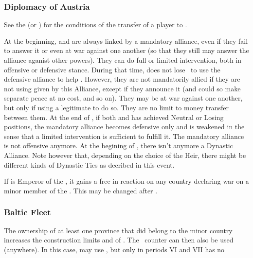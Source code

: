 \subsubsection{Diplomacy of Austria}

\aparag See the  (or
) for the conditions of the
transfer of a player to \AUS.

\label{chSpecific:Habsburg Dynastic Alliance:Major}
\bparag At the beginning,  \SPA and \AUS are always linked by a
mandatory alliance, even if they fail to answer it or even at war against
one another (so that they still may answer the alliance aganist other powers).
They can do full or limited intervention, both in offensive or defensive stance.
\bparag During that time, \SPA does not lose \STAB\ to use the defensive
alliance to help \AUS.
\bparag However, they are not mandatorily allied if they are not using
\CB given by this Alliance, except if they announce it (and could so
make separate peace at no cost, and so on).
\bparag They may be at war against one another, but only if using a
legitimate \CB to do so.
\bparag They are no limit to money transfer between them.
\bparag At the end of , if both \SPA and \AUS has
achieved Neutral or Losing positions, the mandatory alliance becomes
defensive only and is weakened in the sense that a limited intervention
is sufficient to fulfill it. The mandatory alliance is not offensive
anymore.
\bparag At the begining of  , there isn't anymore a Dynastic
Alliance. Note however that, depending on the choice of the Heir, there might
be different kinds of Dynastic Ties as decribed in this event.

\aparag[\HRE] If \AUS is Emperor of the \HRE,
it gains a free \CB in reaction on any country declaring war on a minor
member of the \HRE.
This may be changed after .

\subsubsection{Baltic Fleet}\label{chSpecific:Austria:Baltic Fleet}
\aparag The ownership of at least one province that did belong to the
 minor country increases the construction limits and
 of \AUS.
\bparag The \AUS\ \FLEET counter can then also be used (anywhere).
\bparag In this case, \AUS may use \TradeFLEET, but only in periods VI
and VII
\aparag \AUS has no \CTZ

